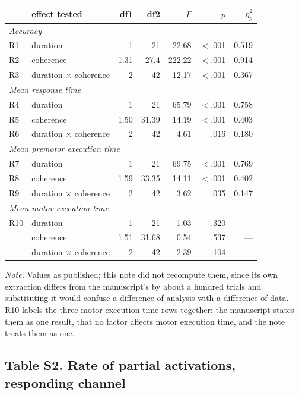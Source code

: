 \begin{center}\small
\begin{tabular}{llrrrrr}
\toprule
& effect tested & df1 & df2 & $F$ & $p$ & $\eta_p^2$\\
\midrule
\multicolumn{7}{l}{\emph{Accuracy}}\\
R1 & duration & 1 & 21 & 22.68 & $<$.001 & 0.519\\
R2 & coherence & 1.31 & 27.4 & 222.22 & $<$.001 & 0.914\\
R3 & duration $\times$ coherence & 2 & 42 & 12.17 & $<$.001 & 0.367\\
\multicolumn{7}{l}{\emph{Mean response time}}\\
R4 & duration & 1 & 21 & 65.79 & $<$.001 & 0.758\\
R5 & coherence & 1.50 & 31.39 & 14.19 & $<$.001 & 0.403\\
R6 & duration $\times$ coherence & 2 & 42 & 4.61 & .016 & 0.180\\
\multicolumn{7}{l}{\emph{Mean premotor execution time}}\\
R7 & duration & 1 & 21 & 69.75 & $<$.001 & 0.769\\
R8 & coherence & 1.59 & 33.35 & 14.11 & $<$.001 & 0.402\\
R9 & duration $\times$ coherence & 2 & 42 & 3.62 & .035 & 0.147\\
\multicolumn{7}{l}{\emph{Mean motor execution time}}\\
R10 & duration & 1 & 21 & 1.03 & .320 & ---\\
& coherence & 1.51 & 31.68 & 0.54 & .537 & ---\\
& duration $\times$ coherence & 2 & 42 & 2.39 & .104 & ---\\
\bottomrule
\end{tabular}
\end{center}

\noindent\emph{Note.} Values as published; this note did not recompute them, since its
own extraction differs from the manuscript's by about a hundred trials and substituting it
would confuse a difference of analysis with a difference of data. R10 labels the three
motor-execution-time rows together: the manuscript states them as one result, that no
factor affects motor execution time, and the note treats them as one.

\subsection*{Table S2. Rate of partial activations, responding channel}


